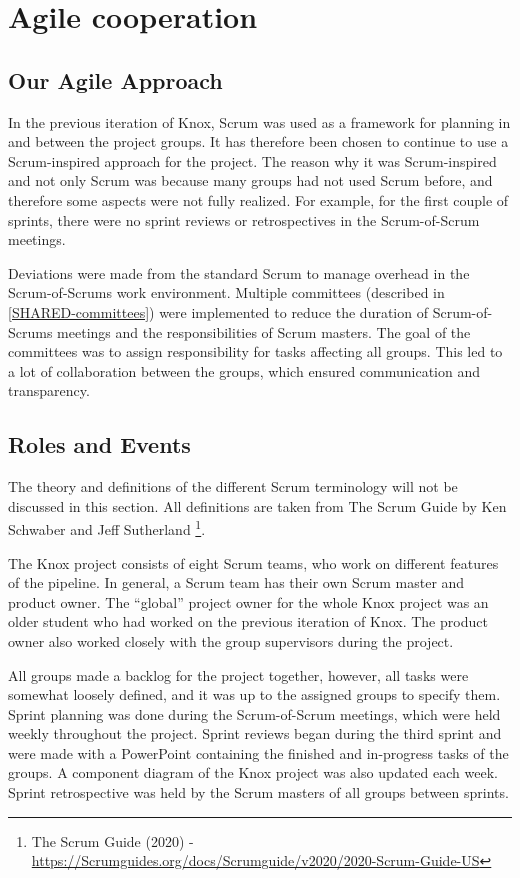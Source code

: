 \section{Agile cooperation}
\tiny {}

\subsection{Our Agile Approach}
In the previous iteration of Knox, Scrum was used as a framework for planning in and between the project groups. It has therefore been chosen to continue to use a Scrum-inspired approach for the project. The reason why it was Scrum-inspired and not only Scrum was because many groups had not used Scrum before, and therefore some aspects were not fully realized. For example, for the first couple of sprints, there were no sprint reviews or retrospectives in the Scrum-of-Scrum meetings.  

Deviations were made from the standard Scrum to manage overhead in the Scrum-of-Scrums work environment. Multiple committees (described in \autoref{SHARED-committees}) were implemented to reduce the duration of Scrum-of-Scrums meetings and the responsibilities of Scrum masters. The goal of the committees was to assign responsibility for tasks affecting all groups.
This led to a lot of collaboration between the groups, which ensured communication and transparency. 

\subsection{Roles and Events}
The theory and definitions of the different Scrum terminology will not be discussed in this section. All definitions are taken from The Scrum Guide by Ken Schwaber and Jeff Sutherland
\footnote{The Scrum Guide (2020) - \url{https://Scrumguides.org/docs/Scrumguide/v2020/2020-Scrum-Guide-US}}.


The Knox project consists of eight Scrum teams, who work on different features of the pipeline. In general, a Scrum team has their own Scrum master and product owner. The “global” project owner for the whole Knox project was an older student who had worked on the previous iteration of Knox. The product owner also worked closely with the group supervisors during the project.

All groups made a backlog for the project together, however, all tasks were somewhat loosely defined, and it was up to the assigned groups to specify them. Sprint planning was done during the Scrum-of-Scrum meetings, which were held weekly throughout the project. Sprint reviews began during the third sprint and were made with a PowerPoint containing the finished and in-progress tasks of the groups. A component diagram of the Knox project was also updated each week. Sprint retrospective was held by the Scrum masters of all groups between sprints.
